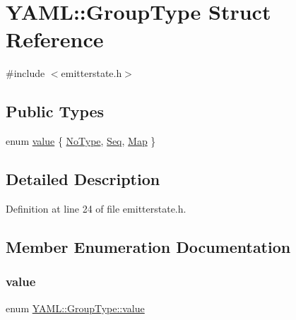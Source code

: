 \hypertarget{struct_y_a_m_l_1_1_group_type}{}\section{Y\+A\+ML\+::Group\+Type Struct Reference}
\label{struct_y_a_m_l_1_1_group_type}


{\ttfamily \#include $<$emitterstate.\+h$>$}

\subsection*{Public Types}
\begin{DoxyCompactItemize}
\item 
enum \mbox{\hyperlink{struct_y_a_m_l_1_1_group_type_aab9271cd8999a6694cb10670e6a5496f}{value}} \{ \mbox{\hyperlink{struct_y_a_m_l_1_1_group_type_aab9271cd8999a6694cb10670e6a5496fa92ec6d79a9f88c03f43256becb6ea041}{No\+Type}}, 
\mbox{\hyperlink{struct_y_a_m_l_1_1_group_type_aab9271cd8999a6694cb10670e6a5496fa311f71fb8d563bb3ba77c78ba9ee7edd}{Seq}}, 
\mbox{\hyperlink{struct_y_a_m_l_1_1_group_type_aab9271cd8999a6694cb10670e6a5496fab0341128e5042d59f569143a526edb29}{Map}}
 \}
\end{DoxyCompactItemize}


\subsection{Detailed Description}


Definition at line 24 of file emitterstate.\+h.



\subsection{Member Enumeration Documentation}
\mbox{\label{struct_y_a_m_l_1_1_group_type_aab9271cd8999a6694cb10670e6a5496f}} 
\subsubsection{\texorpdfstring{value}{value}}
{\footnotesize\ttfamily enum \mbox{\hyperlink{struct_y_a_m_l_1_1_group_type_aab9271cd8999a6694cb10670e6a5496f}{Y\+A\+M\+L\+::\+Group\+Type\+::value}}}

